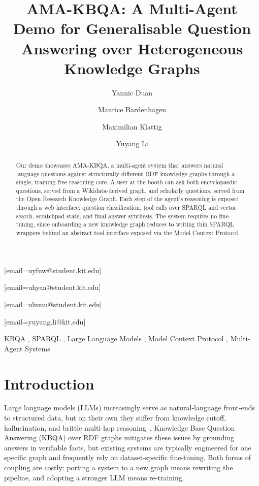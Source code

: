 \documentclass[sigconf,natbib=true]{ceurart}
\begin{document}


\title{AMA-KBQA: A Multi-Agent Demo for Generalisable Question Answering over Heterogeneous Knowledge Graphs}

\author[1]{Yannic Duan}[email=uyfnw@student.kit.edu]
\author[1]{Maurice Bardenhagen}[email=uhyaa@student.kit.edu]
\author[1]{Maximilian Klattig}[email=ulumu@student.kit.edu]
\author[1]{Yuyang Li}[email=yuyang.li@kit.edu]
\address[1]{Institute AIFB, Karlsruhe Institute of Technology (KIT), Kaiserstr.\ 12, 76131 Karlsruhe, Germany}

\begin{abstract}
Our demo showcases AMA-KBQA, a multi-agent system that answers natural
language questions against structurally different RDF knowledge graphs
through a single, training-free reasoning core. A user at the booth
can ask both encyclopaedic questions, served from a Wikidata-derived
graph, and scholarly questions, served from the Open Research
Knowledge Graph. Each step of the agent's reasoning is exposed through
a web interface: question classification, tool calls over SPARQL and
vector search, scratchpad state, and final answer synthesis. The
system requires no fine-tuning, since onboarding a new knowledge graph
reduces to writing thin SPARQL wrappers behind an abstract tool
interface exposed via the Model Context Protocol.
\end{abstract}

\begin{keywords}
  KBQA \sep
  SPARQL \sep
  Large Language Models \sep
  Model Context Protocol \sep
  Multi-Agent Systems
\end{keywords}

\maketitle

\section{Introduction}

Large language models (LLMs) increasingly serve as natural-language
front-ends to structured data, but on their own they suffer from
knowledge cutoff, hallucination, and brittle multi-hop
reasoning~\cite{ji2023survey}. Knowledge Base Question Answering
(KBQA) over RDF graphs mitigates these issues by grounding answers in
verifiable facts, but existing systems are typically engineered for
one specific graph and frequently rely on dataset-specific
fine-tuning. Both forms of coupling are costly: porting a system to a
new graph means rewriting the pipeline, and adopting a stronger LLM
means re-training.
\end{document}
